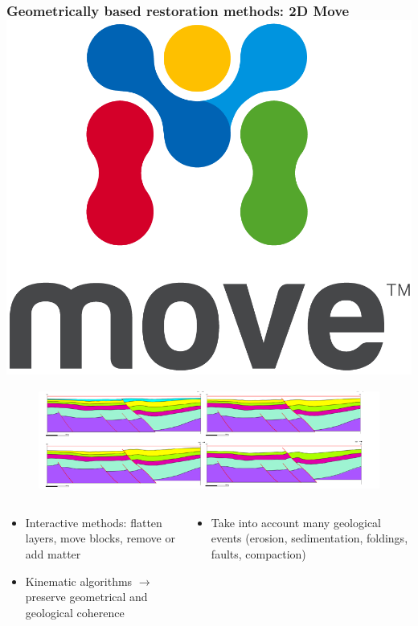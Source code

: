 \documentclass{beamer}
\begin{document}
	 \begin{frame}
	\frametitle{Geometrically based restoration methods: 2D Move 
  \includegraphics[scale=0.13]{Move_logo_-01.png}}
	 \begin{figure}[H]
	\centering
	\includegraphics[scale=1.8]{mve2Dmini.png}
	\label{mve}
	\end{figure}
	\begin{columns}
	\begin{column}{0.55\textwidth}
	\begin{itemize}
	\item Interactive methods: flatten layers, move blocks, remove or add matter
	\item Kinematic algorithms $\longrightarrow$ preserve geometrical and geological coherence
	\end{itemize}
	\end{column}
	\begin{column}{0.55\textwidth}
	\begin{itemize}
	\item Take into account many geological events (erosion, sedimentation, foldings, faults, compaction)
	\end{itemize}
	\end{column}
	\end{columns}
    \end{frame}   
    
\end{document}
